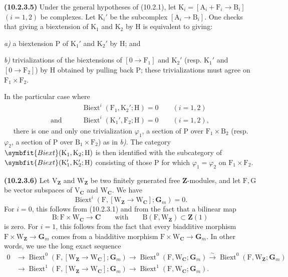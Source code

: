 \documentclass[11pt,leqno]{article}
\newcommand{\Page}[1]{\ifvmode\noindent\else\unskip\ \fi{\footnotesize\textcolor{gray}{[p.\,#1]}}\ \ignorespaces}
\begin{document}
\textbf{(10.2.3.5)} Under the general hypotheses of (10.2.1), let
\(\mathrm{K}_i=[\mathrm{A}_i+\mathrm{F}_i\to\mathrm{B}_i]\)
\((i=1,2)\) be complexes. Let \(\mathrm{K}_i'\) be the subcomplex
\([\mathrm{A}_i\to\mathrm{B}_i]\). One checks that giving
a biextension of \(\mathrm{K}_1\) and
\(\mathrm{K}_2\) by \(\mathrm{H}\) is equivalent to giving:

\noindent\textit{a)} a biextension \(\mathrm{P}\) of
\(\mathrm{K}_1'\) and \(\mathrm{K}_2'\) by \(\mathrm{H}\); and

\noindent\textit{b)} trivializations of the biextensions of
\([0\to\mathrm{F}_1]\) and \(\mathrm{K}_2'\)
(resp. \(\mathrm{K}_1'\) and \([0\to\mathrm{F}_2]\)) by
\(\mathrm{H}\) obtained by pulling back \(\mathrm{P}\); these
trivializations must agree on
\(\mathrm{F}_1\times\mathrm{F}_2\).

In the particular case where
\begin{align*}
&\operatorname{Biext}^{i}(\mathrm{F}_1,\mathrm{K}_2';\mathrm{H})=0
\qquad(i=1,2)\\
\text{and}\qquad&
\operatorname{Biext}^{i}(\mathrm{K}_1',\mathrm{F}_2;\mathrm{H})=0
\qquad(i=1,2),
\end{align*}
\Page{62}
there is one and only one trivialization \(\varphi_1\), a section of
\(\mathrm{P}\) over \(\mathrm{F}_1\times\mathrm{B}_2\)
(resp. \(\varphi_2\), a section of \(\mathrm{P}\) over
\(\mathrm{B}_1\times\mathrm{F}_2\)) as in \textit{b)}.
The category
\(\symbfit{Biext}(\mathrm{K}_1,\mathrm{K}_2;\mathrm{H})\)
is then identified with the subcategory of
\(\symbfit{Biext}(\mathrm{K}_1',\mathrm{K}_2';\mathrm{H})\)
consisting of those \(\mathrm{P}\) for which \(\varphi_1=\varphi_2\)
on \(\mathrm{F}_1\times\mathrm{F}_2\).

\textbf{(10.2.3.6)} Let \(\mathrm{V}_{\mathbf{Z}}\) and
\(\mathrm{W}_{\mathbf{Z}}\) be two finitely generated free
\(\mathbf{Z}\)-modules, and let \(\mathrm{F},\mathrm{G}\) be vector subspaces
of \(\mathrm{V}_{\mathbf{C}}\) and \(\mathrm{W}_{\mathbf{C}}\). We have
\[
\operatorname{Biext}^{i}(\mathrm{F},
[\mathrm{W}_{\mathbf{Z}}\to\mathrm{W}_{\mathbf{C}}];\mathbf{G}_m)=0.
\]
For \(i=0\), this follows from (10.2.3.1) and from the fact that a
bilinear map
\[
\mathrm{B}:\mathrm{F}\times\mathrm{W}_{\mathbf{C}}\to\mathbf{C}
\qquad\text{with}\qquad
\mathrm{B}(\mathrm{F},\mathrm{W}_{\mathbf{Z}})\subset\mathbf{Z}(1)
\]
is zero. For \(i=1\), this follows from the fact that every biadditive
morphism
\(\mathrm{F}\times\mathrm{W}_{\mathbf{Z}}\to\mathbf{G}_m\)
comes from a biadditive morphism
\(\mathrm{F}\times\mathrm{W}_{\mathbf{C}}\to\mathbf{G}_m\).
In other words, we use the long exact sequence
\[
\begin{aligned}
0&\to\operatorname{Biext}^{0}(\mathrm{F},
[\mathrm{W}_{\mathbf{Z}}\to\mathrm{W}_{\mathbf{C}}];\mathbf{G}_m)
\to\operatorname{Biext}^{0}(\mathrm{F},\mathrm{W}_{\mathbf{C}};\mathbf{G}_m)
\xrightarrow{\sim}
\operatorname{Biext}^{0}(\mathrm{F},\mathrm{W}_{\mathbf{Z}};\mathbf{G}_m)\\
&\to\operatorname{Biext}^{1}(\mathrm{F},
[\mathrm{W}_{\mathbf{Z}}\to\mathrm{W}_{\mathbf{C}}];\mathbf{G}_m)
\to\operatorname{Biext}^{1}(\mathrm{F},\mathrm{W}_{\mathbf{C}};\mathbf{G}_m).
\end{aligned}
\]
\end{document}
